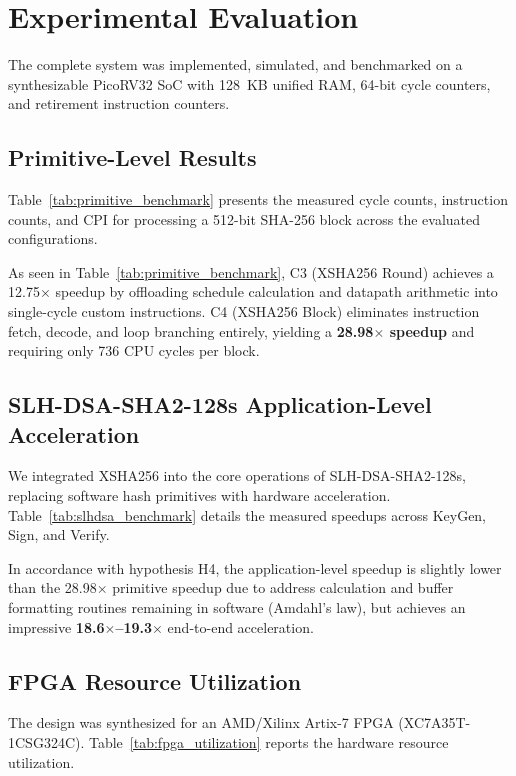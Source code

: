 \documentclass[conference]{IEEEtran}
\begin{document}
\section{Experimental Evaluation}
The complete system was implemented, simulated, and benchmarked on a synthesizable PicoRV32 SoC with 128~KB unified RAM, 64-bit cycle counters, and retirement instruction counters.

\subsection{Primitive-Level Results}
Table~\ref{tab:primitive_benchmark} presents the measured cycle counts, instruction counts, and CPI for processing a 512-bit SHA-256 block across the evaluated configurations.



As seen in Table~\ref{tab:primitive_benchmark}, C3 (XSHA256 Round) achieves a 12.75$\times$ speedup by offloading schedule calculation and datapath arithmetic into single-cycle custom instructions. C4 (XSHA256 Block) eliminates instruction fetch, decode, and loop branching entirely, yielding a \textbf{28.98$\times$ speedup} and requiring only 736 CPU cycles per block.

\subsection{SLH-DSA-SHA2-128s Application-Level Acceleration}
We integrated XSHA256 into the core operations of SLH-DSA-SHA2-128s, replacing software hash primitives with hardware acceleration. Table~\ref{tab:slhdsa_benchmark} details the measured speedups across KeyGen, Sign, and Verify.



In accordance with hypothesis H4, the application-level speedup is slightly lower than the 28.98$\times$ primitive speedup due to address calculation and buffer formatting routines remaining in software (Amdahl's law), but achieves an impressive \textbf{18.6$\times$--19.3$\times$} end-to-end acceleration.

\subsection{FPGA Resource Utilization}
The design was synthesized for an AMD/Xilinx Artix-7 FPGA (XC7A35T-1CSG324C). Table~\ref{tab:fpga_utilization} reports the hardware resource utilization.
\end{document}
